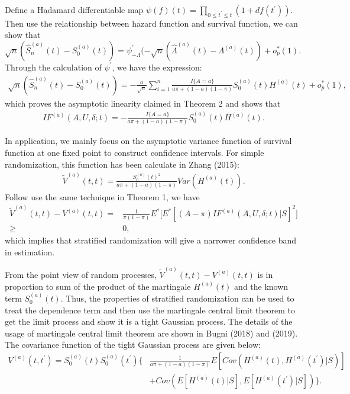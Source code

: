 \documentclass{article}
\begin{document}
Define a Hadamard differentiable map $\psi(f)(t) = \prod_{0\leq t^{\prime}\leq t} (1+ d f(t^{\prime}))$. Then use the relationship between hazard function and survival function, we can show that $ \sqrt{n}(\hat{S}_n^{(a)}(t)-S_0^{(a)}(t))=\psi_{-\Lambda}^{\prime}(-\sqrt{n}(\hat{\Lambda}^{(a)}(t)-\Lambda^{(a)}(t))+o_p^{*}(1)$. Through the calculation of $\psi^{\prime}$, we have the expression:
\begin{align}
    \sqrt{n}(\hat{S}_n^{(a)}(t)-S_0^{(a)}(t))=-\frac{a}{\sqrt{n}}\sum_{i=1}^n\frac{I\{A=a\}}{a\pi+(1-a)(1-\pi)}S_0^{(a)}(t)H^{(a)}(t)+o_p^{*}(1),\nonumber
\end{align}
which proves the asymptotic linearity claimed in Theorem 2 and shows that
\begin{align}\label{sur if}
    IF^{(a)}(A,U,\delta;t)=-\frac{I\{A=a\}}{a\pi+(1-a)(1-\pi)}S_0^{(a)}(t)H^{(a)}(t).
\end{align}

In application, we mainly focus on the asymptotic variance function of survival function at one fixed point to construct confidence intervals. For simple randomization, this function has been calculate in Zhang (2015):
\begin{align}
    \widetilde{V}^{(a)}(t,t)=\frac{S_0^{(a)}(t)^2}{a\pi+(1-a)(1-\pi)} Var(H^{(a)}(t)).\nonumber
\end{align}
Follow use the same technique in Theorem 1, we have
\begin{align}
     \widetilde{V}^{(a)}(t,t)-V^{(a)}(t,t)=&\frac{1}{\pi(1-\pi)}E^{*}\big[E^{*}[(A-\pi)IF^{(a)}(A,U,\delta;t)|S]^2\big]\\
     \geq &0,\nonumber
\end{align}
which implies that stratified randomization will give a narrower confidence band in estimation.

From the point view of random processes, $\widetilde{V}^{(a)}(t,t)-V^{(a)}(t,t)$ is in proportion to sum of the product of the martingale $H^{(a)}(t)$ and the known term $S_0^{(a)}(t)$. Thus, the properties of stratified randomization can be used to treat the dependence term and then use the martingale central limit theorem to get the limit process and show it is a tight Gaussian process. The details of the usage of martingale central limit theorem are shown in Bugni (2018)\cite{bugni2018inference} and (2019)\cite{bugni2019inference}. The covariance function of the tight Gaussian process are given below:
\begin{align}\label{covar}
    V^{(a)}(t,t^{\prime})=S_0^{(a)}(t)S_0^{(a)}(t^{\prime})\Big\{&\frac{1}{a\pi+(1-a)(1-\pi)}E[Cov(H^{(a)}(t),H^{(a)}(t^{\prime})|S)]\\
    &+Cov(E[H^{(a)}(t)|S], E[H^{(a)}(t^{\prime})|S])  \Big\}.
\end{align}
\end{document}
